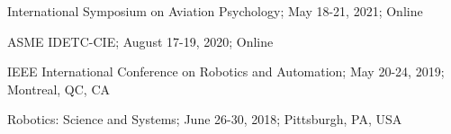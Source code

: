 

\begin{cvitems}

	\vspace{4.0mm}
	\item
	{International Symposium on Aviation Psychology; May 18-21, 2021; Online}
	\item
	{ASME IDETC-CIE; August 17-19, 2020; Online}
	\item
	{IEEE International Conference on Robotics and Automation; May 20-24, 2019; Montreal, QC, CA}
  	\item
    {Robotics: Science and Systems; June 26-30, 2018; Pittsburgh, PA, USA}
    
\end{cvitems}
\vspace{4.0mm}
